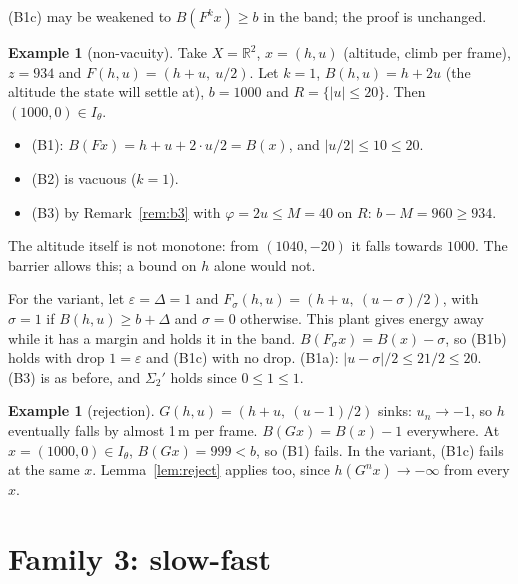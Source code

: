 \documentclass[11pt]{article}
\theoremstyle{definition}
\newtheorem{example}[theorem]{Example}
\newcommand{\R}{\mathbb{R}}
\begin{document}
(B1c) may be weakened to $B(F^k x) \ge b$ in the band; the proof is unchanged.

\begin{example}[non-vacuity]\label{ex:barrier}
Take $X = \R^2$, $x = (h, u)$ (altitude, climb per frame), $z = 934$ and $F(h, u) = (h + u,\ u/2)$. Let $k = 1$, $B(h, u) = h + 2u$ (the altitude the state will settle at), $b = 1000$ and $R = \{|u| \le 20\}$. Then $(1000, 0) \in I_\theta$.
\begin{itemize}
\item (B1): $B(F x) = h + u + 2\cdot u/2 = B(x)$, and $|u/2| \le 10 \le 20$.
\item (B2) is vacuous ($k = 1$).
\item (B3) by Remark~\ref{rem:b3} with $\varphi = 2u \le M = 40$ on $R$: $b - M = 960 \ge 934$.
\end{itemize}
The altitude itself is not monotone: from $(1040, -20)$ it falls towards $1000$. The barrier allows this; a bound on $h$ alone would not.

For the variant, let $\varepsilon = \Delta = 1$ and $F_\sigma(h, u) = (h + u,\ (u - \sigma)/2)$, with $\sigma = 1$ if $B(h, u) \ge b + \Delta$ and $\sigma = 0$ otherwise. This plant gives energy away while it has a margin and holds it in the band. $B(F_\sigma x) = B(x) - \sigma$, so (B1b) holds with drop $1 = \varepsilon$ and (B1c) with no drop. (B1a): $|u - \sigma|/2 \le 21/2 \le 20$. (B3) is as before, and $\Sigma_2'$ holds since $0 \le 1 \le 1$.
\end{example}

\begin{example}[rejection]\label{ex:barriernot}
$G(h, u) = (h + u,\ (u - 1)/2)$ sinks: $u_n \to -1$, so $h$ eventually falls by almost 1\,m per frame. $B(G x) = B(x) - 1$ everywhere. At $x = (1000, 0) \in I_\theta$, $B(G x) = 999 < b$, so (B1) fails. In the variant, (B1c) fails at the same $x$. Lemma~\ref{lem:reject} applies too, since $h(G^n x) \to -\infty$ from every $x$.
\end{example}

\section{Family 3: slow-fast}\label{sec:sf}
\end{document}
